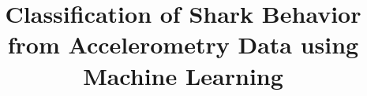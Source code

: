 \documentclass[conference]{IEEEtran}
\begin{document}
\title{Classification of Shark Behavior from Accelerometry Data  using Machine Learning}


\end{document}
